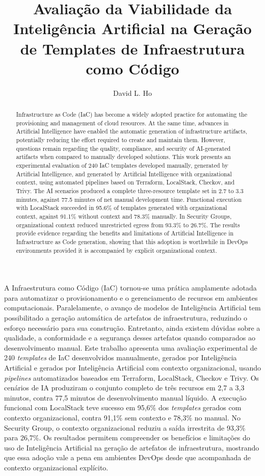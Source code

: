 \documentclass[12pt]{article}
\title{Avaliação da Viabilidade da Inteligência Artificial na Geração de Templates de Infraestrutura como Código}
\author{David L. Ho\inst{1}}
\begin{document}
 
\raggedbottom

\maketitle
\begin{abstract}
Infrastructure as Code (IaC) has become a widely adopted practice for automating the provisioning and management of cloud resources. At the same time, advances in Artificial Intelligence have enabled the automatic generation of infrastructure artifacts, potentially reducing the effort required to create and maintain them. However, questions remain regarding the quality, compliance, and security of AI-generated artifacts when compared to manually developed solutions. This work presents an experimental evaluation of 240 IaC templates developed manually, generated by Artificial Intelligence, and generated by Artificial Intelligence with organizational context, using automated pipelines based on Terraform, LocalStack, Checkov, and Trivy. The AI scenarios produced a complete three-resource template set in 2.7 to 3.3 minutes, against 77.5 minutes of net manual development time. Functional execution with LocalStack succeeded in 95.6\% of templates generated with organizational context, against 91.1\% without context and 78.3\% manually. In Security Groups, organizational context reduced unrestricted egress from 93.3\% to 26.7\%. The results provide evidence regarding the benefits and limitations of Artificial Intelligence in Infrastructure as Code generation, showing that this adoption is worthwhile in DevOps environments provided it is accompanied by explicit organizational context.
\end{abstract}
\begin{resumo}
A Infraestrutura como Código (IaC) tornou-se uma prática amplamente adotada para automatizar o provisionamento e o gerenciamento de recursos em ambientes computacionais. Paralelamente, o avanço de modelos de Inteligência Artificial tem possibilitado a geração automática de artefatos de infraestrutura, reduzindo o esforço necessário para sua construção. Entretanto, ainda existem dúvidas sobre a qualidade, a conformidade e a segurança desses artefatos quando comparados ao desenvolvimento manual. Este trabalho apresenta uma avaliação experimental de 240 \textit{templates} de IaC desenvolvidos manualmente, gerados por Inteligência Artificial e gerados por Inteligência Artificial com contexto organizacional, usando \textit{pipelines} automatizados baseados em Terraform, LocalStack, Checkov e Trivy. Os cenários de IA produziram o conjunto completo de três recursos em 2,7 a 3,3 minutos, contra 77,5 minutos de desenvolvimento manual líquido. A execução funcional com LocalStack teve sucesso em 95,6\% dos \textit{templates} gerados com contexto organizacional, contra 91,1\% sem contexto e 78,3\% no manual. No Security Group, o contexto organizacional reduziu a saída irrestrita de 93,3\% para 26,7\%. Os resultados permitem compreender os benefícios e limitações do uso de Inteligência Artificial na geração de artefatos de infraestrutura, mostrando que essa adoção vale a pena em ambientes DevOps desde que acompanhada de contexto organizacional explícito.
\end{resumo}
\end{document}
